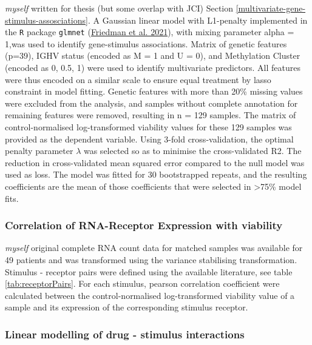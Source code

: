 \documentclass[11pt, a4paper, twosided]{book}
\begin{document}
\emph{myself} written for thesis (but some overlap with JCI)
Section \ref{multivariate-gene-stimulus-assosciations}. A Gaussian linear model with L1-penalty implemented in the \texttt{R} package \texttt{glmnet} (\protect\hyperlink{ref-R-glmnet}{Friedman et al. 2021}), with mixing parameter alpha = 1,was used to identify gene-stimulus associations. Matrix of genetic features (p=39), IGHV status (encoded as M = 1 and U = 0), and Methylation Cluster (encoded as 0, 0.5, 1) were used to identify multivariate predictors. All features were thus encoded on a similar scale to ensure equal treatment by lasso constraint in model fitting. Genetic features with more than 20\% missing values were excluded from the analysis, and samples without complete annotation for remaining features were removed, resulting in n = 129 samples. The matrix of control-normalised log-transformed viability values for these 129 samples was provided as the dependent variable. Using 3-fold cross-validation, the optimal penalty parameter \(\lambda\) was selected so as to minimise the cross-validated R2. The reduction in cross-validated mean squared error compared to the null model was used as loss. The model was fitted for 30 bootstrapped repeats, and the resulting coefficients are the mean of those coefficients that were selected in \textgreater75\% model fits.

\hypertarget{correlation-of-rna-receptor-expression-with-viability}{%
\subsubsection{Correlation of RNA-Receptor Expression with viability}\label{correlation-of-rna-receptor-expression-with-viability}}

\emph{myself} original complete
RNA count data for matched samples was available for 49 patients and was transformed using the variance stabilising transformation. Stimulus - receptor pairs were defined using the available literature, see table \ref{tab:receptorPairs}. For each stimulus, pearson correlation coefficient were calculated between the control-normalised log-transformed viability value of a sample and its expression of the corresponding stimulus receptor.

\hypertarget{linear-modelling-of-drug---stimulus-interactions}{%
\subsubsection{Linear modelling of drug - stimulus interactions}\label{linear-modelling-of-drug---stimulus-interactions}}
\end{document}
